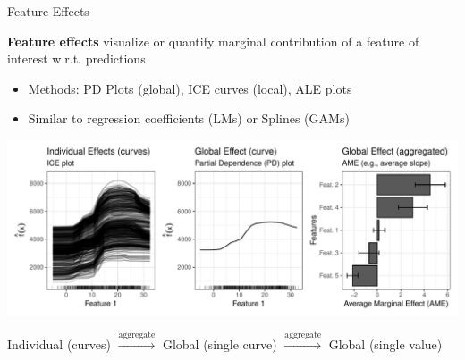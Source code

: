 \documentclass[11pt,compress,t,notes=noshow, aspectratio=169, xcolor=table]{beamer}
\begin{document}
\begin{frame}{Feature Effects}

\textbf{Feature effects} visualize or quantify marginal contribution of a feature of interest w.r.t. predictions %
\begin{itemize}
\item Methods: PD Plots (global), ICE curves (local), ALE plots
\item Similar to regression coefficients (LMs) or Splines (GAMs)
\end{itemize}

\centerline{\includegraphics[width=\textwidth]{figure/feature-effect.pdf}}

\centerline{\small \hspace{20px} Individual (curves) \hspace{8px}
$\xrightarrow[]{\text{aggregate}}$ \hspace{8px} Global (single curve) \hspace{8px}
$\xrightarrow[]{\text{aggregate}}$ \hspace{8px} Global (single value)}


\end{frame}


\endlecture
\end{document}
